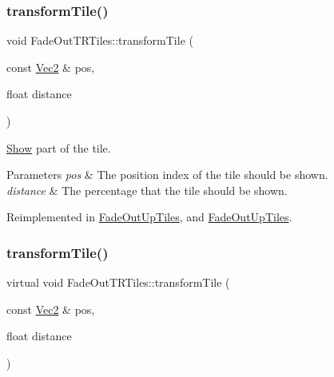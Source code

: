 \subsubsection{\texorpdfstring{transform\+Tile()}{transformTile()}\hspace{0.1cm}{\footnotesize\ttfamily [1/2]}}
{\footnotesize\ttfamily void Fade\+Out\+T\+R\+Tiles\+::transform\+Tile (\begin{DoxyParamCaption}\item[{const \hyperlink{classVec2}{Vec2} \&}]{pos,  }\item[{float}]{distance }\end{DoxyParamCaption})\hspace{0.3cm}{\ttfamily [virtual]}}



\hyperlink{classShow}{Show} part of the tile. 


\begin{DoxyParams}{Parameters}
{\em pos} & The position index of the tile should be shown. \\
\hline
{\em distance} & The percentage that the tile should be shown. \\
\hline
\end{DoxyParams}


Reimplemented in \hyperlink{classFadeOutUpTiles_a00c6d04f5b87f24d43dbc6a18dc96670}{Fade\+Out\+Up\+Tiles}, and \hyperlink{classFadeOutUpTiles_a408548b6434137f3be0cb47fe43c2e2d}{Fade\+Out\+Up\+Tiles}.

\mbox{\label{classFadeOutTRTiles_ab7fc12d0e4293a24947dc6c3aaeabaca}} 
\subsubsection{\texorpdfstring{transform\+Tile()}{transformTile()}\hspace{0.1cm}{\footnotesize\ttfamily [2/2]}}
{\footnotesize\ttfamily virtual void Fade\+Out\+T\+R\+Tiles\+::transform\+Tile (\begin{DoxyParamCaption}\item[{const \hyperlink{classVec2}{Vec2} \&}]{pos,  }\item[{float}]{distance }\end{DoxyParamCaption})\hspace{0.3cm}{\ttfamily [virtual]}}




